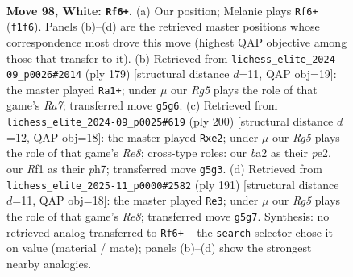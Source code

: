 \documentclass[11pt]{article}
\begin{document}
\clearpage

\begin{figure}[p]\centering
\begin{subfigure}{0.46\textwidth}\centering
\resizebox{\linewidth}{!}{%
\newchessgame
\chessboard[
  setfen={1r6/1P6/1k6/6R1/4K3/8/b7/5R2 w - - 3 98},
  showmover=false,
  pgfstyle=straightmove, color=movearrow, markmove={f1-f6}
]}
\caption{}
\end{subfigure}\hfill
\begin{subfigure}{0.46\textwidth}\centering
\resizebox{\linewidth}{!}{%
\newchessgame
\chessboard[
  setfen={8/8/8/8/4p3/4R3/r7/3K1k2 b - - 25 90},
  showmover=false,
  pgfstyle=straightmove, color=movearrow, markmove={a2-a1}
]}
\caption{}
\end{subfigure}
\\[4pt]
\begin{subfigure}{0.46\textwidth}\centering
\resizebox{\linewidth}{!}{%
\newchessgame
\chessboard[
  setfen={4R3/7p/8/rP3k2/8/2K5/4p3/8 w - - 5 101},
  showmover=false,
  pgfstyle=straightmove, color=movearrow, markmove={e8-e2}
]}
\caption{}
\end{subfigure}\hfill
\begin{subfigure}{0.46\textwidth}\centering
\resizebox{\linewidth}{!}{%
\newchessgame
\chessboard[
  setfen={8/8/3k4/8/1K6/7p/7R/4r3 b - - 8 96},
  showmover=false,
  pgfstyle=straightmove, color=movearrow, markmove={e1-e3}
]}
\caption{}
\end{subfigure}
\caption{\textbf{Move 98, White: \texttt{Rf6+}.} (a) Our position; Melanie plays \texttt{Rf6+} (\texttt{f1f6}). Panels (b)--(d) are the retrieved master positions whose correspondence most drove this move (highest QAP objective among those that transfer to it). (b) Retrieved from \texttt{lichess\_elite\_2024-09\_p0026\#2014} (ply 179) [structural distance $d$=11, QAP obj=19]: the master played \texttt{Ra1+}; under $\mu$ our \emph{Rg5} plays the role of that game's \emph{Ra7}; transferred move \texttt{g5g6}. (c) Retrieved from \texttt{lichess\_elite\_2024-09\_p0025\#619} (ply 200) [structural distance $d$=12, QAP obj=18]: the master played \texttt{Rxe2}; under $\mu$ our \emph{Rg5} plays the role of that game's \emph{Re8}; cross-type roles: our \emph{b}a2 as their \emph{p}e2, our \emph{R}f1 as their \emph{p}h7; transferred move \texttt{g5g3}. (d) Retrieved from \texttt{lichess\_elite\_2025-11\_p0000\#2582} (ply 191) [structural distance $d$=11, QAP obj=18]: the master played \texttt{Re3}; under $\mu$ our \emph{Rg5} plays the role of that game's \emph{Re8}; transferred move \texttt{g5g7}. Synthesis: no retrieved analog transferred to \texttt{Rf6+} -- the \texttt{search} selector chose it on value (material / mate); panels (b)--(d) show the strongest nearby analogies.}
\label{fig:thought-m194}
\end{figure}
\end{document}

